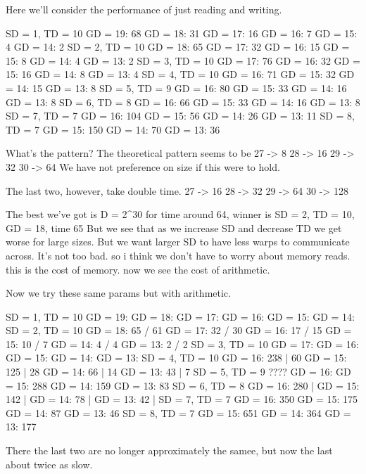 Here we'll consider the performance of just reading and writing. 

SD = 1, TD = 10
    GD = 19: 68
    GD = 18: 31
    GD = 17: 16
    GD = 16: 7
    GD = 15: 4
    GD = 14: 2
SD = 2, TD = 10
    GD = 18: 65
    GD = 17: 32
    GD = 16: 15
    GD = 15: 8
    GD = 14: 4
    GD = 13: 2
SD = 3, TD = 10
    GD = 17: 76
    GD = 16: 32
    GD = 15: 16
    GD = 14: 8
    GD = 13: 4
SD = 4, TD = 10
    GD = 16: 71
    GD = 15: 32
    GD = 14: 15
    GD = 13: 8
SD = 5, TD = 9
    GD = 16: 80
    GD = 15: 33
    GD = 14: 16
    GD = 13: 8
SD = 6, TD = 8
    GD = 16: 66
    GD = 15: 33
    GD = 14: 16
    GD = 13: 8
SD = 7, TD = 7
    GD = 16: 104
    GD = 15: 56
    GD = 14: 26
    GD = 13: 11
SD = 8, TD = 7
    GD = 15: 150
    GD = 14: 70
    GD = 13: 36

What's the pattern?
The theoretical pattern seems to be
27 -> 8
28 -> 16
29 -> 32
30 -> 64
We have not preference on size if this were to hold.

The last two, however, take double time.
27 -> 16
28 -> 32
29 -> 64
30 -> 128

The best we've got is D = 2^30 for time around 64, winner is SD = 2, TD = 10, GD = 18, time 65
But we see that as we increase SD and decrease TD we get worse for large sizes.
But we want larger SD to have less warps to communicate across. 
It's not too bad. so i think we don't have to worry about memory reads. this is the cost of memory. now we see the cost of arithmetic. 

Now we try these same params but with arithmetic.

SD = 1, TD = 10
    GD = 19: 
    GD = 18: 
    GD = 17: 
    GD = 16: 
    GD = 15: 
    GD = 14: 
SD = 2, TD = 10
    GD = 18: 65 / 61
    GD = 17: 32 / 30
    GD = 16: 17 / 15
    GD = 15: 10 / 7
    GD = 14: 4 / 4
    GD = 13: 2 / 2
SD = 3, TD = 10
    GD = 17: 
    GD = 16: 
    GD = 15: 
    GD = 14: 
    GD = 13: 
SD = 4, TD = 10
    GD = 16: 238 | 60
    GD = 15: 125 | 28
    GD = 14: 66 | 14
    GD = 13: 43 | 7
SD = 5, TD = 9 ????
    GD = 16: 
    GD = 15: 288
    GD = 14: 159
    GD = 13: 83
SD = 6, TD = 8
    GD = 16: 280 |
    GD = 15: 142 | 
    GD = 14: 78 |
    GD = 13: 42 |
SD = 7, TD = 7
    GD = 16: 350
    GD = 15: 175
    GD = 14: 87
    GD = 13: 46
SD = 8, TD = 7
    GD = 15: 651
    GD = 14: 364
    GD = 13: 177

There the last two are no longer approximately the samee, but now the last about twice as slow.









